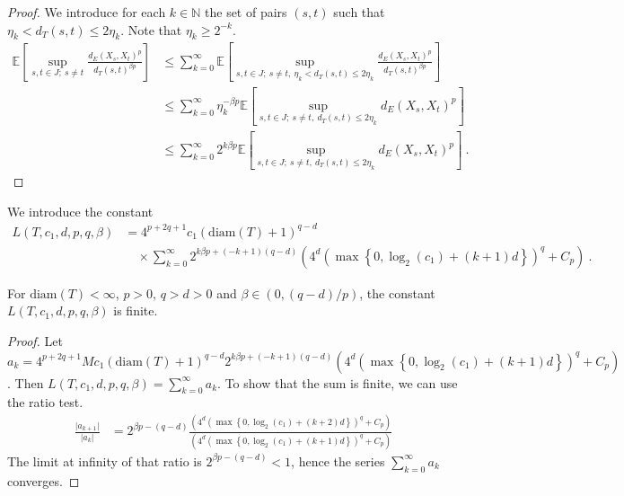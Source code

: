 \begin{proof}\leanok
We introduce for each $k \in \mathbb{N}$ the set of pairs $(s, t)$ such that $\eta_k < d_T(s, t) \le 2 \eta_k$.
Note that $\eta_k \ge 2^{-k}$.
\begin{align*}
  \mathbb{E}\left[ \sup_{s, t \in J;\: s \ne t} \frac{d_E(X_s, X_t)^p}{d_T(s, t)^{\beta p}} \right]
  &\le \sum_{k=0}^\infty \mathbb{E}\left[ \sup_{s, t \in J;\: s \ne t, \: \eta_k < d_T(s, t) \le 2 \eta_k} \frac{d_E(X_s, X_t)^p}{d_T(s, t)^{\beta p}} \right]
  \\
  &\le \sum_{k=0}^\infty \eta_k^{-\beta p} \mathbb{E}\left[ \sup_{s, t \in J;\: s \ne t, \: d_T(s, t) \le 2 \eta_k} d_E(X_s, X_t)^p \right]
  \\
  &\le \sum_{k=0}^\infty 2^{k \beta p} \mathbb{E}\left[ \sup_{s, t \in J;\: s \ne t, \: d_T(s, t) \le 2 \eta_k} d_E(X_s, X_t)^p \right]
  \: .
\end{align*}
\end{proof}


\begin{definition}\label{def:L}
  \leanok
We introduce the constant
\begin{align*}
  L(T, c_1, d, p, q, \beta)
  &= 4^{p+2q+1} c_1 (\mathrm{diam}(T)+1)^{q-d}
  \\&\quad \times \sum_{k=0}^\infty 2^{k \beta p + (-k + 1)(q-d)}\left(4^d \left(\max\left\{0, \log_2(c_1) + (k + 1)d \right\}\right)^q
    + C_p\right)
  \: .
\end{align*}
\end{definition}


\begin{lemma}\label{lem:L_lt_top}
  \leanok
For $\mathrm{diam}(T) < \infty$, $p> 0$, $q > d > 0$ and $\beta \in (0, (q-d)/p)$, the constant $L(T, c_1, d, p, q, \beta)$ is finite.
\end{lemma}

\begin{proof}
Let $a_k = 4^{p+2q+1} M c_1 (\mathrm{diam}(T)+1)^{q-d} 2^{k \beta p + (-k + 1)(q-d)} \left(4^d \left(\max\left\{0, \log_2(c_1) + (k + 1)d \right\}\right)^q
    + C_p\right)$.
Then $L(T, c_1, d, p, q, \beta) = \sum_{k=0}^\infty a_k$.
To show that the sum is finite, we can use the ratio test.
\begin{align*}
  \frac{\vert a_{k+1} \vert}{\vert a_k \vert}
  &= 2^{\beta p - (q - d)}
    \frac{\left(4^d \left(\max\left\{0, \log_2(c_1) + (k + 2)d \right\}\right)^q + C_p\right)}
    {\left(4^d \left(\max\left\{0, \log_2(c_1) + (k + 1)d \right\}\right)^q + C_p\right)}
\end{align*}
The limit at infinity of that ratio is $2^{\beta p - (q - d)} < 1$, hence the series $\sum_{k=0}^\infty a_k$ converges.
\end{proof}


